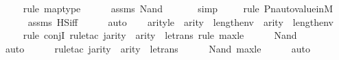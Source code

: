 \begin{isabellebody}
\ \ \ \ \isamarkupfalse%
{\isacharparenleft}{\kern0pt}rule\ map{\isacharunderscore}{\kern0pt}type{\isacharparenright}{\kern0pt}\isanewline
\ \ \ \ \isamarkupfalse%
\ assms\ Nand\isanewline
\ \ \ \ \ \isamarkupfalse%
\ simp\isanewline
\ \ \ \ \isamarkupfalse%
{\isacharparenleft}{\kern0pt}rule\ Pn{\isacharunderscore}{\kern0pt}auto{\isacharunderscore}{\kern0pt}value{\isacharunderscore}{\kern0pt}in{\isacharunderscore}{\kern0pt}M{\isacharparenright}{\kern0pt}\isanewline
\ \ \ \ \isamarkupfalse%
\ assms\ HS{\isacharunderscore}{\kern0pt}iff\isanewline
\ \ \ \ \isamarkupfalse%
\ auto\isanewline
\isanewline
\ \ \isamarkupfalse%
\ arityle\ {\isacharcolon}{\kern0pt}\ {\isachardoublequoteopen}arity{\isacharparenleft}{\kern0pt}{\isasymphi}{\isacharparenright}{\kern0pt}\ {\isasymle}\ length{\isacharparenleft}{\kern0pt}env{\isacharparenright}{\kern0pt}\ {\isasymand}\ arity{\isacharparenleft}{\kern0pt}{\isasympsi}{\isacharparenright}{\kern0pt}\ {\isasymle}\ length{\isacharparenleft}{\kern0pt}env{\isacharparenright}{\kern0pt}{\isachardoublequoteclose}\isanewline
\ \ \ \ \isamarkupfalse%
{\isacharparenleft}{\kern0pt}rule\ conjI{\isacharcomma}{\kern0pt}\ rule{\isacharunderscore}{\kern0pt}tac\ j{\isacharequal}{\kern0pt}{\isachardoublequoteopen}arity{\isacharparenleft}{\kern0pt}{\isasymphi}{\isacharparenright}{\kern0pt}\ {\isasymunion}\ arity{\isacharparenleft}{\kern0pt}{\isasympsi}{\isacharparenright}{\kern0pt}{\isachardoublequoteclose}\ \ le{\isacharunderscore}{\kern0pt}trans{\isacharcomma}{\kern0pt}\ rule\ max{\isacharunderscore}{\kern0pt}le{}{\isacharparenright}{\kern0pt}\isanewline
\ \ \ \ \isamarkupfalse%
\ Nand\isanewline
\ \ \ \ \ \ \ \isamarkupfalse%
\ auto{\isacharbrackleft}{\kern0pt}{}{\isacharbrackright}{\kern0pt}\isanewline
\ \ \ \ \ \isamarkupfalse%
{\isacharparenleft}{\kern0pt}rule{\isacharunderscore}{\kern0pt}tac\ j{\isacharequal}{\kern0pt}{\isachardoublequoteopen}arity{\isacharparenleft}{\kern0pt}{\isasymphi}{\isacharparenright}{\kern0pt}\ {\isasymunion}\ arity{\isacharparenleft}{\kern0pt}{\isasympsi}{\isacharparenright}{\kern0pt}{\isachardoublequoteclose}\ \ le{\isacharunderscore}{\kern0pt}trans{\isacharparenright}{\kern0pt}\isanewline
\ \ \ \ \isamarkupfalse%
\ Nand\ max{\isacharunderscore}{\kern0pt}le{}\isanewline
\ \ \ \ \isamarkupfalse%
\ auto\isanewline
\isanewline

\end{isabellebody}
